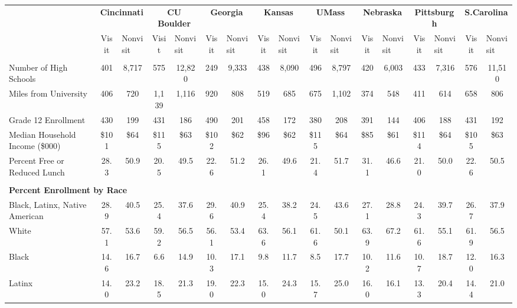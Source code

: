 \begin{tabular*}{\linewidth}{@{\extracolsep{\fill} } lcccccccccccccccc}%
&\multicolumn{2}{c}{\bfseries Cincinnati}&\multicolumn{2}{c}{\bfseries CU Boulder}&\multicolumn{2}{c}{\bfseries Georgia}&\multicolumn{2}{c}{\bfseries Kansas}&\multicolumn{2}{c}{\bfseries UMass}&\multicolumn{2}{c}{\bfseries Nebraska}&\multicolumn{2}{c}{\bfseries Pittsburgh}&\multicolumn{2}{c}{\bfseries S.Carolina}\\%
&Visit&\multicolumn{1}{l}{Nonvisit}&Visit&\multicolumn{1}{l}{Nonvisit}&Visit&\multicolumn{1}{l}{Nonvisit}&Visit&\multicolumn{1}{l}{Nonvisit}&Visit&\multicolumn{1}{l}{Nonvisit}&Visit&\multicolumn{1}{l}{Nonvisit}&Visit&\multicolumn{1}{l}{Nonvisit}&Visit&\multicolumn{1}{l}{Nonvisit}\\%
\hline%
&&&&&&&&&&&&&&&&\\%
\hspace{0cm}Number of High Schools&401&8,717&575&12,820&249&9,333&438&8,090&496&8,797&420&6,003&433&7,316&576&11,510\\%
\hspace{0cm}Miles from University&406&720&1,139&1,116&920&808&519&685&675&1,102&374&548&411&614&658&806\\%
\hspace{0cm}Grade 12 Enrollment&430&199&431&186&490&201&458&172&380&208&391&144&406&188&431&192\\%
\hspace{0cm}Median Household Income (\$000)&\$101&\$64&\$115&\$63&\$102&\$62&\$96&\$62&\$115&\$64&\$85&\$61&\$114&\$64&\$105&\$63\\%
\hspace{0cm}Percent Free or Reduced Lunch&28.3&50.9&20.5&49.5&22.6&51.2&26.1&49.6&21.4&51.7&31.1&46.6&21.0&50.0&22.6&50.5\\%
&&&&&&&&&&&&&&&&\\%
\multicolumn{17}{l}{\bfseries Percent Enrollment by Race}\\%
\hspace{0.2cm}Black, Latinx, Native American&28.9&40.5&25.4&37.6&29.6&40.9&25.4&38.2&24.5&43.6&27.1&28.8&24.3&39.7&26.7&37.9\\%
\hspace{0.2cm}White&57.1&53.6&59.2&56.5&56.1&53.4&63.6&56.1&61.6&50.1&63.9&67.2&61.6&55.1&61.9&56.5\\%
\hspace{0.2cm}Black&14.6&16.7&6.6&14.9&10.3&17.1&9.8&11.7&8.5&17.7&10.2&11.6&10.7&18.7&12.0&16.3\\%
\hspace{0.2cm}Latinx&14.0&23.2&18.5&21.3&19.0&22.3&15.0&24.3&15.7&25.0&16.0&16.1&13.3&20.4&14.4&21.0\\%

\end{tabular*}
